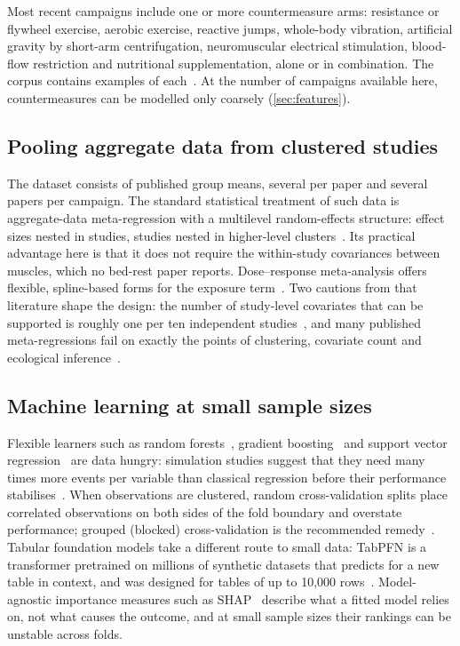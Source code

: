 Most recent campaigns include one or more countermeasure arms: resistance or flywheel exercise, aerobic exercise,
reactive jumps, whole-body vibration, artificial gravity by short-arm centrifugation, neuromuscular electrical
stimulation, blood-flow restriction and nutritional supplementation, alone or in combination. The corpus contains
examples of each~\citep[e.g.][]{zange2009,kramer2017,mandic2026,hansen2024,fuchs2025bfr,trappe2024sprint}. At the
number of campaigns available here, countermeasures can be modelled only coarsely (\cref{sec:features}).

\subsection{Pooling aggregate data from clustered studies}

The dataset consists of published group means, several per paper and several papers per campaign. The standard
statistical treatment of such data is aggregate-data meta-regression with a multilevel random-effects structure:
effect sizes nested in studies, studies nested in higher-level clusters~\citep{assink2016,harrer2021,viechtbauer2010}.
Its practical advantage here is that it does not require the within-study covariances between muscles, which no
bed-rest paper reports. Dose--response meta-analysis offers flexible, spline-based forms for the exposure
term~\citep{crippa2019}. Two cautions from that literature shape the design: the number of study-level covariates
that can be supported is roughly one per ten independent studies~\citep{higgins2011}, and many published
meta-regressions fail on exactly the points of clustering, covariate count and ecological
inference~\citep{geissbuhler2021}.

\subsection{Machine learning at small sample sizes}

Flexible learners such as random forests~\citep{breiman2001}, gradient boosting~\citep{friedman2001} and support
vector regression~\citep{smola2004} are data hungry: simulation studies suggest that they need many times more
events per variable than classical regression before their performance stabilises~\citep{vanderploeg2014}. When
observations are clustered, random cross-validation splits place correlated observations on both sides of the fold
boundary and overstate performance; grouped (blocked) cross-validation is the recommended
remedy~\citep{roberts2017}. Tabular foundation models take a different route to small data: TabPFN is a transformer
pretrained on millions of synthetic datasets that predicts for a new table in context, and was designed for tables
of up to 10,000 rows~\citep{hollmann2025}. Model-agnostic importance measures such as SHAP~\citep{lundberg2017} describe what a
fitted model relies on, not what causes the outcome, and at small sample sizes their rankings can be unstable
across folds.

